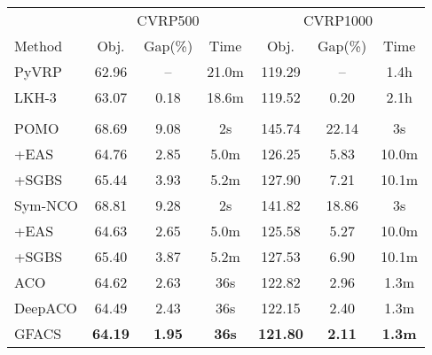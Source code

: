 \documentclass{article}
\begin{document}
\begin{table}[H]
\begin{minipage}[t]{0.495 \textwidth}
\begin{tabular}{l ccc ccc}
& \multicolumn{3}{c}{CVRP500} & \multicolumn{3}{c}{CVRP1000}\\
\cmidrule(lr){2-4}\cmidrule(lr){5-7}
Method & Obj. & Gap(\%) & Time & Obj. & Gap(\%) & Time \\
\midrule[1pt]
PyVRP              & 62.96 & --    & 21.0m & 119.29 & --   & 1.4h \\
LKH-3              & 63.07 & 0.18  & 18.6m & 119.52 & 0.20 & 2.1h \\
\cmidrule(lr){1-1}\cmidrule(lr){2-4}\cmidrule(lr){5-7}
    &    &   &   &   &   &  \\
POMO               & 68.69 & 9.08  & 2s    & 145.74 & 22.14 & 3s \\
\quad +EAS         & 64.76 & 2.85  & 5.0m  & 126.25 & 5.83  & 10.0m \\
\quad +SGBS        & 65.44 & 3.93  & 5.2m  & 127.90 & 7.21  & 10.1m \\
Sym\mbox{-}NCO     & 68.81 & 9.28  & 2s    & 141.82 & 18.86 & 3s \\
\quad +EAS         & 64.63 & 2.65  & 5.0m  & 125.58 & 5.27  & 10.0m \\
\quad +SGBS        & 65.40 & 3.87  & 5.2m  & 127.53 & 6.90  & 10.1m \\
\cmidrule(lr){1-1}\cmidrule(lr){2-4}\cmidrule(lr){5-7}
ACO                & 64.62 & 2.63 & 36s & 122.82 & 2.96 & 1.3m \\
DeepACO            & 64.49 & 2.43 & 36s & 122.15 & 2.40 & 1.3m \\
GFACS& \textbf{64.19} & \textbf{1.95} & \textbf{36s} &
\textbf{121.80} & \textbf{2.11} & \textbf{1.3m} \\
\bottomrule[1pt]
\end{tabular}
\end{minipage}
\end{table}
\restoregeometry

\end{document}
